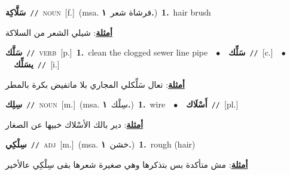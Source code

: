 \documentclass[10pt,a4paper,twoside]{article} %
\begin{document}
\begin{multicols}{2}
{\setlength\topsep{0pt}\textbf{\foreignlanguage{arabic}{سَلَّاكِة}}\ {\color{gray}\texttt{//}\color{black}}\ \textsc{noun}\ [f.]\ \color{gray}(msa. \foreignlanguage{arabic}{فرشاة شعر}~\foreignlanguage{arabic}{\textbf{١.}})\color{black}\ \textbf{1.}~hair brush\  \begin{flushright}\color{gray}\foreignlanguage{arabic}{\textbf{\underline{\foreignlanguage{arabic}{أمثلة}}}: شيلي الشعر من السلاكة}\end{flushright}\color{black}} \vspace{2mm}

{\setlength\topsep{0pt}\textbf{\foreignlanguage{arabic}{سَلَّك}}\ {\color{gray}\texttt{//}\color{black}}\ \textsc{verb}\ [p.]\ \textbf{1.}~clean the clogged sewer line pipe\ \ $\bullet$\ \ \setlength\topsep{0pt}\textbf{\foreignlanguage{arabic}{سَلِّك}}\ {\color{gray}\texttt{//}\color{black}}\ [c.]\ \ $\bullet$\ \ \setlength\topsep{0pt}\textbf{\foreignlanguage{arabic}{يسَلِّك}}\ {\color{gray}\texttt{//}\color{black}}\ [i.]\  \begin{flushright}\color{gray}\foreignlanguage{arabic}{\textbf{\underline{\foreignlanguage{arabic}{أمثلة}}}: تعال سَلِّكلي المجاري بلا ماتفيض بكرة بالمطر}\end{flushright}\color{black}} \vspace{2mm}

{\setlength\topsep{0pt}\textbf{\foreignlanguage{arabic}{سِلِك}}\ {\color{gray}\texttt{//}\color{black}}\ \textsc{noun}\ [m.]\ \color{gray}(msa. \foreignlanguage{arabic}{سِلْك}~\foreignlanguage{arabic}{\textbf{١.}})\color{black}\ \textbf{1.}~wire\ \ $\bullet$\ \ \setlength\topsep{0pt}\textbf{\foreignlanguage{arabic}{أَسْلَاك}}\ {\color{gray}\texttt{//}\color{black}}\ [pl.]\  \begin{flushright}\color{gray}\foreignlanguage{arabic}{\textbf{\underline{\foreignlanguage{arabic}{أمثلة}}}: دير بالك الأسْلاك خبيها عن الصغار}\end{flushright}\color{black}} \vspace{2mm}

{\setlength\topsep{0pt}\textbf{\foreignlanguage{arabic}{سِلْكِي}}\ {\color{gray}\texttt{//}\color{black}}\ \textsc{adj}\ [m.]\ \color{gray}(msa. \foreignlanguage{arabic}{خشن}~\foreignlanguage{arabic}{\textbf{١.}})\color{black}\ \textbf{1.}~rough (hair)\  \begin{flushright}\color{gray}\foreignlanguage{arabic}{\textbf{\underline{\foreignlanguage{arabic}{أمثلة}}}: مش متأكدة بس بتذكرها وهي صغيرة شعرها بقى سِلْكِي عالأخير}\end{flushright}\color{black}} \vspace{2mm}


\end{multicols}
\end{document}
